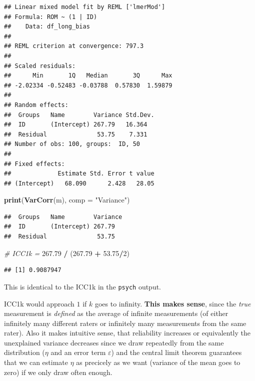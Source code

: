\documentclass[
]{book}
\newenvironment{Shaded}{\begin{snugshade}}{\end{snugshade}}
\newcommand{\AttributeTok}[1]{\textcolor[rgb]{0.13,0.29,0.53}{#1}}
\newcommand{\CommentTok}[1]{\textcolor[rgb]{0.56,0.35,0.01}{\textit{#1}}}
\newcommand{\DecValTok}[1]{\textcolor[rgb]{0.00,0.00,0.81}{#1}}
\newcommand{\FloatTok}[1]{\textcolor[rgb]{0.00,0.00,0.81}{#1}}
\newcommand{\FunctionTok}[1]{\textcolor[rgb]{0.13,0.29,0.53}{\textbf{#1}}}
\newcommand{\NormalTok}[1]{#1}
\newcommand{\SpecialCharTok}[1]{\textcolor[rgb]{0.81,0.36,0.00}{\textbf{#1}}}
\newcommand{\StringTok}[1]{\textcolor[rgb]{0.31,0.60,0.02}{#1}}
\begin{document}
\begin{verbatim}
## Linear mixed model fit by REML ['lmerMod']
## Formula: ROM ~ (1 | ID)
##    Data: df_long_bias
## 
## REML criterion at convergence: 797.3
## 
## Scaled residuals: 
##      Min       1Q   Median       3Q      Max 
## -2.02334 -0.52483 -0.03788  0.57830  1.59879 
## 
## Random effects:
##  Groups   Name        Variance Std.Dev.
##  ID       (Intercept) 267.79   16.364  
##  Residual              53.75    7.331  
## Number of obs: 100, groups:  ID, 50
## 
## Fixed effects:
##             Estimate Std. Error t value
## (Intercept)   68.090      2.428   28.05
\end{verbatim}

\begin{Shaded}
\begin{Highlighting}[]
\FunctionTok{print}\NormalTok{(}\FunctionTok{VarCorr}\NormalTok{(m), }\AttributeTok{comp =} \StringTok{"Variance"}\NormalTok{)}
\end{Highlighting}
\end{Shaded}

\begin{verbatim}
##  Groups   Name        Variance
##  ID       (Intercept) 267.79  
##  Residual              53.75
\end{verbatim}

\begin{Shaded}
\begin{Highlighting}[]
\CommentTok{\# ICC1k = }
\FloatTok{267.79} \SpecialCharTok{/}\NormalTok{ (}\FloatTok{267.79} \SpecialCharTok{+} \FloatTok{53.75}\SpecialCharTok{/}\DecValTok{2}\NormalTok{)}
\end{Highlighting}
\end{Shaded}

\begin{verbatim}
## [1] 0.9087947
\end{verbatim}

This is identical to the ICC1k in the \texttt{psych} output.

ICC1k would approach \(1\) if \(k\) goes to infinity.
\textbf{This makes sense}, since the \emph{true} measurement is \emph{defined} as the average of
infinite measurements (of either infinitely many different raters or infinitely many
measurements from the same rater).
Also it makes intuitive sense, that
reliability increases or equivalently the unexplained variance decreases
since we draw repeatedly from the same distribution (\(\eta\) and an error term \(\varepsilon\))
and the central limit theorem guarantees that we can estimate \(\eta\) as precicely
as we want (variance of the mean goes to zero) if we only draw often enough.
\end{document}
